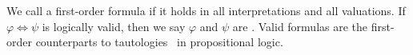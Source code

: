 \begin{definition}\label{fol-000D}%
We call a first-order formula  if it holds in all
interpretations and all valuations. If $\varphi\iff\psi$ is logically
valid, then we say $\varphi$ and $\psi$ are .
Valid formulas are the first-order counterparts to
tautologies~ in propositional logic.
\end{definition}


